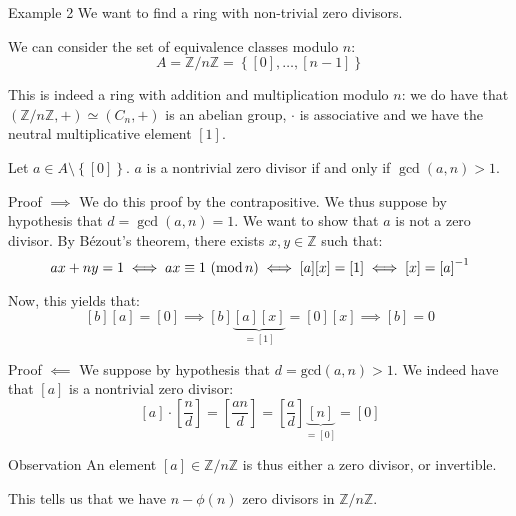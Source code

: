 \documentclass[a4paper]{article}
\begin{document}
\begin{parag}{Example 2}
    We want to find a ring with non-trivial zero divisors. 

    We can consider the set of equivalence classes modulo $n$: 
    \[A = \mathbb{Z}/n\mathbb{Z} = \left\{\left[0\right], \ldots, \left[n-1\right]\right\}\]

    This is indeed a ring with addition and multiplication modulo $n$: we do have that $\left(\mathbb{Z}/n\mathbb{Z}, +\right) \simeq \left(C_n, +\right)$ is an abelian group, $\cdot $ is associative and we have the neutral multiplicative element $\left[1\right]$.

    Let $a \in A \setminus \left\{\left[0\right]\right\}$. $a$ is a nontrivial zero divisor if and only if $\gcd\left(a, n\right) > 1$.

    \begin{subparag}{Proof $\implies$}
        We do this proof by the contrapositive. We thus suppose by hypothesis that $d = \gcd\left(a, n\right) = 1$. We want to show that $a$ is not a zero divisor. By Bézout's theorem, there exists $x, y \in \mathbb{Z}$ such that: 
        \[ax + ny = 1 \iff \congruent{ax}{1}{n} \iff \left[a\right]\left[x\right] = \left[1\right] \iff \left[x\right] = \left[a\right]^{-1}\]
        
        Now, this yields that: 
        \[\left[b\right]\left[a\right] = \left[0\right] \implies \left[b\right]\underbrace{\left[a\right]\left[x\right]}_{= \left[1\right]} = \left[0\right] \left[x\right] \implies \left[b\right] = 0\]
    \end{subparag}

    \begin{subparag}{Proof $\impliedby$}
         We suppose by hypothesis that $d = \text{gcd}\left(a, n\right) > 1$. We indeed have that $\left[a\right]$ is a nontrivial zero divisor: 
    \[\left[a\right] \cdot \left[\frac{n}{d}\right] = \left[\frac{an}{d}\right] = \left[\frac{a}{d}\right] \underbrace{\left[n\right]}_{= \left[0\right]} = \left[0\right]\]
    \end{subparag}
    
    \begin{subparag}{Observation}
        An element $\left[a\right] \in \mathbb{Z}/n\mathbb{Z}$ is thus either a zero divisor, or invertible.

        This tells us that we have $n - \phi\left(n\right)$ zero divisors in $\mathbb{Z}/n\mathbb{Z}$.
    \end{subparag}
\end{parag}
\end{document}

